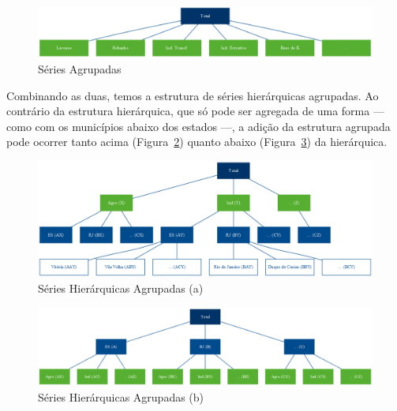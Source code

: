 \documentclass[
  12pt,
  oneside,
  a4paper,
  chapter=TITLE,
  section=TITLE,
  subsubsection=TITLE,
  brazil]{abntex2}
\begin{document}
\begin{figure}

{\centering \includegraphics{img/agrupadas.png}

}

\caption{\label{fig-a}Séries Agrupadas}

\end{figure}

Combinando as duas, temos a estrutura de séries hierárquicas agrupadas.
Ao contrário da estrutura hierárquica, que só pode ser agregada de uma
forma --- como com os municípios abaixo dos estados ---, a adição da
estrutura agrupada pode ocorrer tanto acima (Figura~\ref{fig-ha1})
quanto abaixo (Figura~\ref{fig-ha2}) da hierárquica.

\begin{figure}

{\centering \includegraphics{img/hier_agrup.png}

}

\caption{\label{fig-ha1}Séries Hierárquicas Agrupadas (a)}

\end{figure}

\begin{figure}

{\centering \includegraphics{img/hier_agrup_2.png}

}

\caption{\label{fig-ha2}Séries Hierárquicas Agrupadas (b)}

\end{figure}
\end{document}
